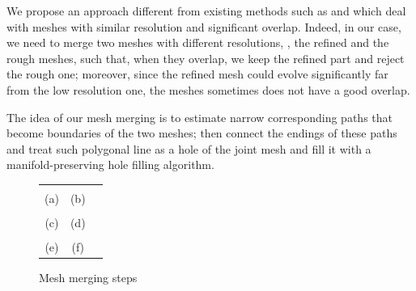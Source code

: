 We propose an approach different from existing methods such as \cite{turk1994zippered} and \cite{VuPhD011} which deal with meshes with similar resolution and significant overlap.
Indeed, in our case, we need to merge two meshes with  different resolutions, \ie, the refined and the rough meshes, such that, when they overlap, we  keep the refined part and reject the rough one; moreover,  since the refined mesh could evolve significantly far from the low resolution one, the meshes sometimes does not have a good overlap.



The idea of our mesh merging is to estimate narrow corresponding paths that become boundaries of the two meshes; then connect the endings of these paths and treat such polygonal line as a hole of the joint mesh and fill it with a manifold-preserving hole filling algorithm.



% 
% 

\begin{figure}[tpb]
\centering
\setlength{\tabcolsep}{1px}
\begin{tabular}{ccc}
{\def\svgwidth{0.48\textwidth}
  }&
{\def\svgwidth{0.48\textwidth}
  }\\
  (a) & (b)\\
{\def\svgwidth{0.48\textwidth}
  }&
{\def\svgwidth{0.48\textwidth}
  }\\
  (c)&(d)\\
{\def\svgwidth{0.48\textwidth}
  }&
{\def\svgwidth{0.48\textwidth}
  }\\
(e)&(f)\\
\end{tabular}
\caption{Mesh merging steps}
\label{fig:mesh_merging}
\end{figure}


